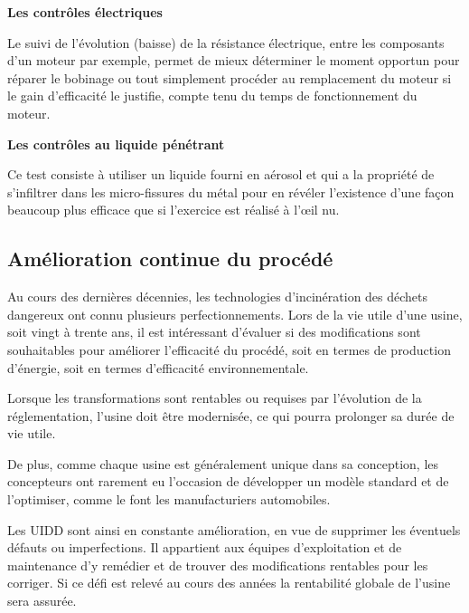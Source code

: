 \vspace{0.3cm}
\textbf{Les contrôles électriques}
\vspace{0.3cm}

Le suivi de l’évolution (baisse) de la résistance électrique, entre les composants d’un moteur par exemple, permet de mieux déterminer le moment opportun pour réparer le bobinage ou tout simplement procéder au remplacement du moteur si le gain d’efficacité le justifie, compte tenu du temps de fonctionnement du moteur.

\vspace{0.3cm}
\textbf{Les contrôles au liquide pénétrant}
\vspace{0.3cm}

Ce test consiste à utiliser un liquide fourni en aérosol et qui a la propriété de s’infiltrer dans les micro-fissures du métal pour en révéler l’existence d’une façon beaucoup plus efficace que si l’exercice est réalisé à l’œil nu.

\subsection{Amélioration continue du procédé}

Au cours des dernières décennies, les technologies d’incinération des déchets dangereux ont connu plusieurs perfectionnements. Lors de la vie utile d’une usine, soit vingt à trente ans, il est intéressant d’évaluer si des modifications sont souhaitables pour améliorer l’efficacité du procédé, soit en termes de production d’énergie, soit en termes d’efficacité environnementale. 
\vspace{0.3cm} 

Lorsque les transformations sont rentables ou requises par l’évolution de la réglementation, l’usine doit être modernisée, ce qui pourra prolonger sa durée de vie utile.
\vspace{0.3cm} 

De plus, comme chaque usine est généralement unique dans sa conception, les concepteurs ont rarement eu l’occasion de développer un modèle standard et de l’optimiser, comme le font les manufacturiers automobiles. 
\vspace{0.3cm} 

Les UIDD sont ainsi en constante amélioration, en vue de supprimer les éventuels défauts ou imperfections. Il appartient aux équipes d’exploitation et de maintenance d’y remédier et de trouver des modifications rentables pour les corriger. Si ce défi est relevé au cours des années la rentabilité globale de l’usine sera assurée.